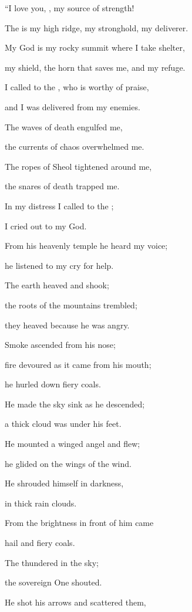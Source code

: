 {\par }{\Q “I love
you,
{}, my source of strength!
\par }{\Q {}The
{}
is my high ridge,
my stronghold,
my deliverer.
\par }{\Q My God
is my rocky
summit where I take shelter,
\par }{\Q my shield,
the horn
that saves
me, and my refuge.
\par }{\Q {}I called
to the
{}, who is worthy of praise,
\par }{\Q and I was delivered
from
my enemies.
\par }{\Q {}The waves
of death
engulfed
me,
\par }{\Q the currents
of chaos
overwhelmed me.
\par }{\Q {}The ropes
of Sheol
tightened
around
me,

\par }{\Q the snares
of death trapped me.
\par }{\Q {}In my distress
I called
to the
{};
\par }{\Q I cried out
to
my God.
\par }{\Q From his heavenly temple
he heard
my voice;
\par }{\Q he listened to my cry
for help.
\par }{\Q {}The earth
heaved
and shook;
\par }{\Q the roots
of the mountains
trembled;
\par }{\Q they heaved
because
he was angry.
\par }{\Q {}Smoke
ascended
from his nose;
\par }{\Q fire
devoured
as it came from
his mouth;
\par }{\Q he hurled down fiery coals.
\par }{\Q {}He made
the sky
sink
as he descended;
\par }{\Q a thick cloud
was under
his feet.
\par }{\Q {}He mounted
a winged
angel and flew;
\par }{\Q he glided
on
the wings
of the wind.
\par }{\Q {}He shrouded
himself in darkness,
\par }{\Q in thick
rain
clouds.
\par }{\Q {}From the brightness
in front
of him came
\par }{\Q hail
and fiery
coals.
\par }{\Q {}The
{}
thundered
in the sky;
\par }{\Q the sovereign
One shouted.
\par }{\Q {}He shot
his arrows
and scattered
them,

}
